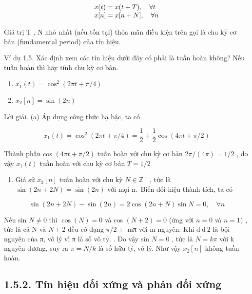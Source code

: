\documentclass[
  10
]{article}
\providecommand{\tightlist}{%
  \setlength{\itemsep}{0pt}\setlength{\parskip}{0pt}}
\begin{document}
\[
\begin{array}{l l} {x (t) = x (t + T), \quad \forall t} \\ {x [ n ] = x [ n + N ], \quad \forall n} \end{array}
\]

Giá trị T , N nhỏ nhất (nếu tồn tại) thỏa mãn điều kiện trên gọi là chu
\(\mathrm { k } \mathrm { \hat { y } }\) cơ bản (fundamental period) của
tín hiệu.

Ví dụ 1.5. Xác định xem các tín hiệu dưới đây có phải là tuần hoàn
không? Nếu tuần hoàn thì hãy tính chu kỳ cơ bản.

\begin{enumerate}
\def\labelenumi{(\alph{enumi})}
\item
  \(x _ { 1 } ( t ) = \cos ^ { 2 } ( 2 \pi t + \pi / 4 )\)
\item
  \(x _ { 2 } [ n ] = \sin ( 2 n )\)
\end{enumerate}

Lời giải. (a) Áp dụng công thức hạ bậc, ta có

\[
x _ {1} (t) = \cos^ {2} (2 \pi t + \pi / 4) = \frac {1}{2} + \frac {1}{2} \cos (4 \pi t + \pi / 2)
\]

Thành phần cos \(( 4 \pi t + \pi / 2 )\) tuần hoàn với chu kỳ cơ bản
\(2 \pi / ( 4 \pi ) = 1 / 2\) , do vậy \(x _ { 1 } ( t )\) tuần hoàn với
chu kỳ cơ bản \(T = 1 / 2\)

\begin{enumerate}
\def\labelenumi{(\alph{enumi})}
\setcounter{enumi}{1}
\tightlist
\item
  Giả sử \(x _ { 2 } [ n ]\) tuần hoàn với chu kỳ
  \(N \in \mathbb { Z } ^ { + }\) , tức là
  \(\sin ( 2 n + 2 N ) = \sin ( 2 n )\) với mọi n.~Biến đổi hiệu thành
  tích, ta có
\end{enumerate}

\[
\sin (2 n + 2 N) - \sin (2 n) = 2 \cos (2 n + N) \sin N = 0, \quad \forall n
\]

Nếu sin \(N \neq 0\) thì \(\cos ( N ) = 0\) và cos \(( N + 2 ) = 0\)
(ứng với \(n = 0\) và \(n = 1 )\) , tức là cả N và \(N + 2\) đều có dạng
\(\pi / 2 +\) mπ với m nguyên. Khi \(\mathrm { d } \mathrm { ~ d ~ } 2\)
là bội nguyên của π, vô lý vì π là số vô
\(\mathrm { t { \overset { \cdot } { y } } } .\) . Do vậy sin \(N = 0\)
, tức là \(N = k \pi\) với k nguyên dương, suy ra \(\pi = N / k\) là số
hữu tỷ, vô lý. Như vậy \(x _ { 2 } [ n ]\) không tuần hoàn. 

\subsection{1.5.2. Tín hiệu đối xứng và phản đối
xứng}\label{tuxedn-hiux1ec7u-ux111ux1ed1i-xux1ee9ng-vuxe0-phux1ea3n-ux111ux1ed1i-xux1ee9ng}
\end{document}
